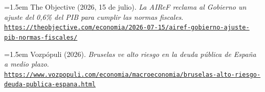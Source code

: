 \documentclass[10pt,a4paper]{article}
\begin{document}
\noindent\hangindent=1.5em The Objective (2026, 15 de julio). \textit{La AIReF reclama al Gobierno un ajuste del 0,6\% del PIB para cumplir las normas fiscales}. \href{https://theobjective.com/economia/2026-07-15/airef-gobierno-ajuste-pib-normas-fiscales/}{\nolinkurl{https://theobjective.com/economia/2026-07-15/airef-gobierno-ajuste-pib-normas-fiscales/}}

\noindent\hangindent=1.5em Vozpópuli (2026). \textit{Bruselas ve alto riesgo en la deuda pública de España a medio plazo}. \href{https://www.vozpopuli.com/economia/macroeconomia/bruselas-alto-riesgo-deuda-publica-espana.html}{\nolinkurl{https://www.vozpopuli.com/economia/macroeconomia/bruselas-alto-riesgo-deuda-publica-espana.html}}


\clearpage
\end{document}
